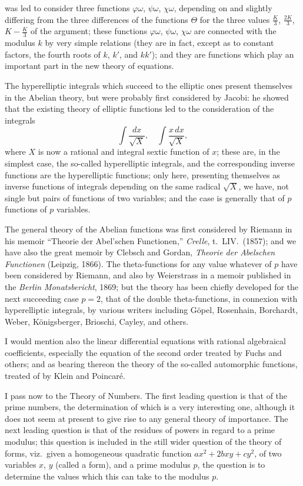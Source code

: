 \documentclass[12pt,a4paper,oneside]{book}
\begin{document}
\newpage
was led to consider three functions $\varphi\omega$, $\psi\omega$, $\chi\omega$, depending on and slightly differing from the three differences of the functions $\Theta$ for the three values $\frac{K}{3}$, $\frac{2K}{3}$, $K-\frac{K}{3}$ of the argument; these functions $\varphi\omega$, $\psi\omega$, $\chi\omega$ are connected with the modulus $k$ by very simple relations (they are in fact, except as to constant factors, the fourth roots of $k$, $k'$, and $kk'$); and they are functions which play an important part in the new theory of equations.

The hyperelliptic integrals which succeed to the elliptic ones present themselves in the Abelian theory, but were probably first considered by Jacobi: he showed that the existing theory of elliptic functions led to the consideration of the integrals
\[
\int \frac{dx}{\surd X},\quad \int \frac{x\,dx}{\surd X},
\]
where $X$ is now a rational and integral sextic function of $x$; these are, in the simplest case, the so-called hyperelliptic integrals, and the corresponding inverse functions are the hyperelliptic functions; only here, presenting themselves as inverse functions of integrals depending on the same radical $\surd X$, we have, not single but pairs of functions of two variables; and the case is generally that of $p$ functions of $p$ variables.

The general theory of the Abelian functions was first considered by Riemann in his memoir ``Theorie der Abel'schen Functionen,'' \textit{Crelle}, t.~LIV.\ (1857); and we have also the great memoir by Clebsch and Gordan, \textit{Theorie der Abelschen Functionen} (Leipzig, 1866). The theta-functions for any value whatever of $p$ have been considered by Riemann, and also by Weierstrass in a memoir published in the \textit{Berlin Monatsbericht}, 1869; but the theory has been chiefly developed for the next succeeding case $p=2$, that of the double theta-functions, in connexion with hyperelliptic integrals, by various writers including G\"opel, Rosenhain, Borchardt, Weber, K\"onigsberger, Brioschi, Cayley, and others.

I would mention also the linear differential equations with rational algebraical coefficients, especially the equation of the second order treated by Fuchs and others; and as bearing thereon the theory of the so-called automorphic functions, treated of by Klein and Poincar\'e.

I pass now to the Theory of Numbers. The first leading question is that of the prime numbers, the determination of which is a very interesting one, although it does not seem at present to give rise to any general theory of importance. The next leading question is that of the residues of powers in regard to a prime modulus; this question is included in the still wider question of the theory of forms, viz.\ given a homogeneous quadratic function $ax^{2}+2bxy+cy^{2}$, of two variables $x$, $y$ (called a form), and a prime modulus $p$, the question is to determine the values which this can take to the modulus $p$.
\end{document}
